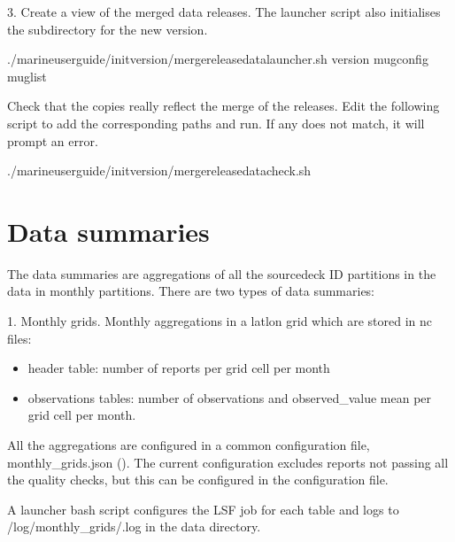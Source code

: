 \documentclass[letterpaper,10pt,english]{sphinxmanual}
\begin{document}
3. Create a view of the merged data releases. The launcher script also initialises the subdirectory for the new version.

\begin{sphinxVerbatim}[commandchars=\\\{\}]
./marine\PYGZhy{}user\PYGZhy{}guide/init\PYGZus{}version/merge\PYGZus{}release\PYGZus{}data\PYGZus{}launcher.sh version mug\PYGZus{}config mug\PYGZus{}list
\end{sphinxVerbatim}

Check that the copies really reflect the merge of the releases. Edit the following script to add the corresponding paths and run. If any does not match, it will prompt an error.

\begin{sphinxVerbatim}[commandchars=\\\{\}]
./marine\PYGZhy{}user\PYGZhy{}guide/init\PYGZus{}version/merge\PYGZus{}release\PYGZus{}data\PYGZus{}check.sh
\end{sphinxVerbatim}


\chapter{Data summaries}
\label{\detokenize{index:data-summaries}}
The data summaries are aggregations of all the source\sphinxhyphen{}deck ID partitions in the
data in monthly partitions. There are two types of data summaries:

1. Monthly grids. Monthly aggregations in a lat\sphinxhyphen{}lon grid which are stored in
nc files:
\begin{itemize}
\item {} 
header table: number of reports per grid cell per month

\item {} 
observations tables: number of observations and observed\_value mean per grid cell per month.

\end{itemize}

All the aggregations are configured in a common configuration file, monthly\_grids.json ({\hyperref[\detokenize{index:mon-grids-config}]{}}). The current configuration excludes
reports not passing all the quality checks, but this can be configured in the
configuration file.

A launcher bash script configures the LSF job for each table and logs to /log/monthly\_grids/.log in the data directory.
\end{document}
